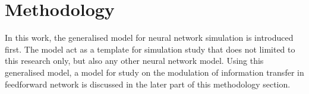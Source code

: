 \chapter{Methodology}
In this work, the generalised model for neural network simulation is introduced first.  The model act as a template for simulation study that does not limited to this research only, but also any other neural network model. Using this generalised model, a model for study on the modulation of information transfer in feedforward network is discussed in the later part of this methodology section. 
